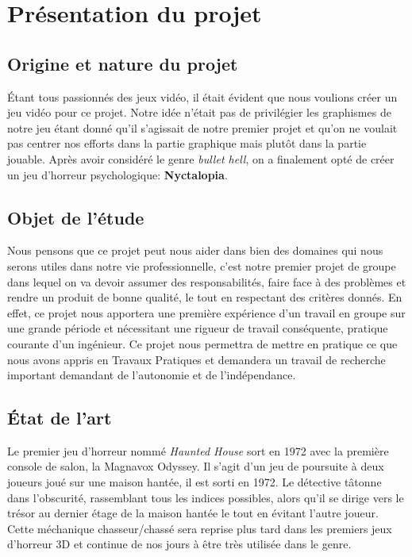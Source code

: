 \section{Présentation du projet}

\subsection{Origine et nature du projet }
\setlength{\parindent}{5ex}
Étant tous passionnés des jeux vidéo, il était évident que nous voulions créer un jeu vidéo pour ce projet. Notre idée n'était pas de privilégier les graphismes de notre jeu étant donné qu'il s'agissait de notre premier projet et qu'on ne voulait pas centrer nos efforts dans la partie graphique mais plutôt dans la partie jouable. Après avoir considéré le genre \emph{bullet hell}, on a finalement opté de créer un jeu d'horreur psychologique: \textbf{Nyctalopia}.

\subsection{Objet de l’étude}
\setlength{\parindent}{5ex}
Nous pensons que ce projet peut nous aider dans bien des domaines qui nous serons utiles dans notre vie professionnelle, c'est notre premier projet de groupe dans lequel on va devoir assumer des responsabilités, faire face à des problèmes et rendre un produit de bonne qualité, le tout en respectant des critères donnés.
\newline\indent
En effet, ce projet nous apportera une première expérience d'un travail en groupe sur une grande période et nécessitant une rigueur de travail conséquente, pratique courante d'un ingénieur.
\newline\indent
Ce projet nous permettra de mettre en pratique ce que nous avons appris en Travaux Pratiques et demandera un travail de recherche important demandant de l'autonomie et de l'indépendance.


\subsection{État de l’art}
\setlength{\parindent}{5ex}
Le premier jeu d'horreur nommé \emph{Haunted House} sort en 1972 avec la première console de salon, la Magnavox Odyssey. Il s'agit d'un jeu de poursuite à deux joueurs joué sur une maison hantée, il est sorti en 1972. Le détective tâtonne dans l'obscurité, rassemblant tous les indices possibles, alors qu'il se dirige vers le trésor au dernier étage de la maison hantée le tout en évitant l'autre joueur. Cette méchanique chasseur/chassé sera reprise plus tard dans les premiers jeux d'horreur 3D et continue de nos jours à être très utilisée dans le genre.

